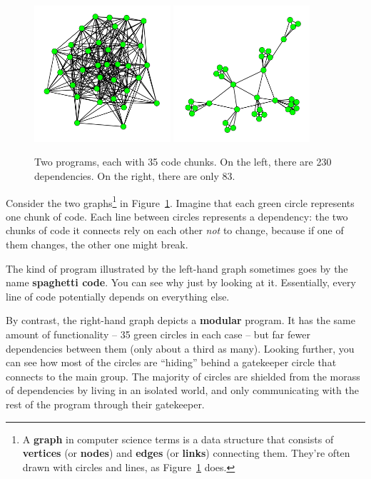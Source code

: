 \begin{figure}[ht]
\centering
\includegraphics[width=0.45\textwidth]{highDependencies.png}
\includegraphics[width=0.45\textwidth]{lowDependencies.png}
\caption{Two programs, each with 35 code chunks. On the left, there are 230
dependencies. On the right, there are only 83.}
\label{fig:dependencies}
\end{figure}

Consider the two graphs\footnote{A \textbf{graph} in computer science terms is
a data structure that consists of \textbf{vertices} (or \textbf{nodes}) and
\textbf{edges} (or \textbf{links}) connecting them. They're often drawn with
circles and lines, as Figure~\ref{fig:dependencies} does.} in
Figure~\ref{fig:dependencies}. Imagine that each green circle represents one
chunk of code. Each line between circles represents a dependency: the two
chunks of code it connects rely on each other \textit{not} to change, because
if one of them changes, the other one might break.

The kind of program illustrated by the left-hand graph sometimes goes by the
name \textbf{spaghetti code}. You can see why just by looking at it.
Essentially, every line of code potentially depends on everything else.

By contrast, the right-hand graph depicts a \textbf{modular} program. It has
the same amount of functionality -- 35 green circles in each case -- but far
fewer dependencies between them (only about a third as many). Looking further,
you can see how most of the circles are ``hiding'' behind a gatekeeper circle
that connects to the main group. The majority of circles are shielded from the
morass of dependencies by living in an isolated world, and only communicating
with the rest of the program through their gatekeeper.


